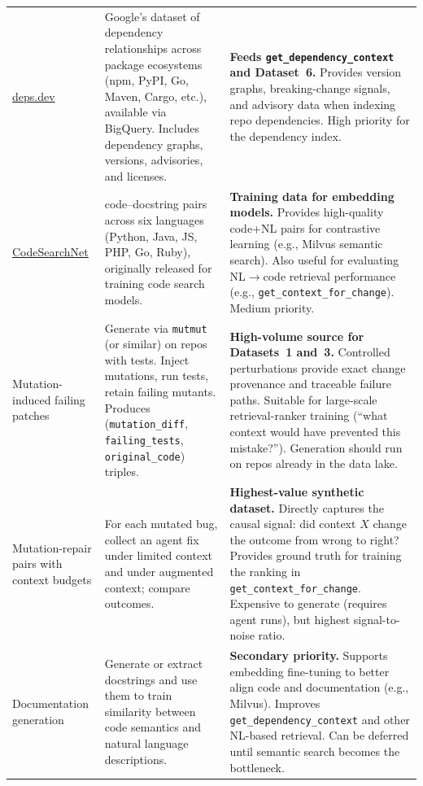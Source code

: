 \documentclass[a4paper,12pt]{article}
\begin{document}
\begin{longtable}{@{} p{3cm} p{5cm} p{7cm} @{}}
\href{https://docs.deps.dev/bigquery/v1/}{deps.dev} &
Google's dataset of dependency relationships across package ecosystems (npm, PyPI, Go, Maven, Cargo, etc.), available via BigQuery. Includes dependency graphs, versions, advisories, and licenses. &
\textbf{Feeds \texttt{get\_dependency\_context} and Dataset~6.} Provides version graphs, breaking-change signals, and advisory data when indexing repo dependencies. High priority for the dependency index. \\

\href{https://github.com/github/CodeSearchNet}{CodeSearchNet} &
 code--docstring pairs across six languages (Python, Java, JS, PHP, Go, Ruby), originally released for training code search models. &
\textbf{Training data for embedding models.} Provides high-quality code+NL pairs for contrastive learning (e.g., Milvus semantic search). Also useful for evaluating NL$\rightarrow$code retrieval performance (e.g., \texttt{get\_context\_for\_change}). Medium priority. \\

Mutation-induced failing patches &
Generate via \texttt{mutmut} (or similar) on repos with tests. Inject mutations, run tests, retain failing mutants. Produces (\texttt{mutation\_diff}, \texttt{failing\_tests}, \texttt{original\_code}) triples. &
\textbf{High-volume source for Datasets~1 and~3.} Controlled perturbations provide exact change provenance and traceable failure paths. Suitable for large-scale retrieval-ranker training (“what context would have prevented this mistake?”). Generation should run on repos already in the data lake. \\

Mutation-repair pairs with context budgets &
For each mutated bug, collect an agent fix under limited context and under augmented context; compare outcomes. &
\textbf{Highest-value synthetic dataset.} Directly captures the causal signal: did context $X$ change the outcome from wrong to right? Provides ground truth for training the ranking in \texttt{get\_context\_for\_change}. Expensive to generate (requires agent runs), but highest signal-to-noise ratio. \\

Documentation generation &
Generate or extract docstrings and use them to train similarity between code semantics and natural language descriptions. &
\textbf{Secondary priority.} Supports embedding fine-tuning to better align code and documentation (e.g., Milvus). Improves \texttt{get\_dependency\_context} and other NL-based retrieval. Can be deferred until semantic search becomes the bottleneck. \\


\end{longtable}
\end{document}
